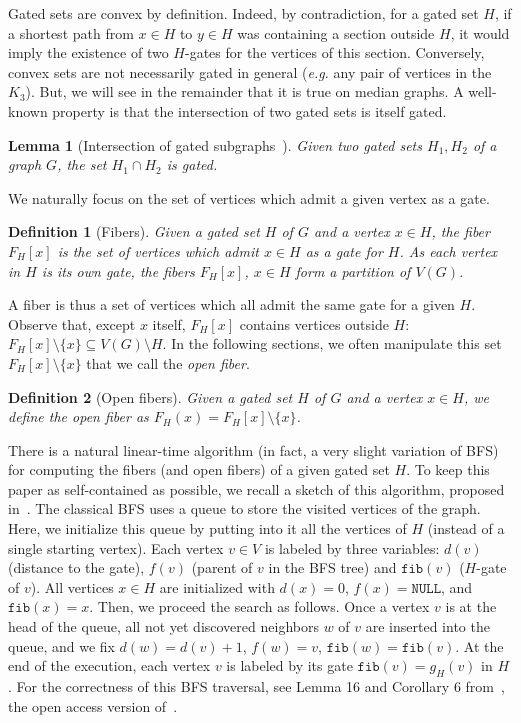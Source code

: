 \documentclass[11pt,letterpaper]{article}
\newtheorem{lemma}{Lemma}
\newtheorem{definition}{Definition}
\begin{document}
Gated sets are convex by definition. Indeed, by contradiction, for a gated set $H$, if a shortest path from $x\in H$ to $y\in H$ was containing a section outside $H$, it would imply the existence of two $H$-gates for the vertices of this section. Conversely, convex sets are not necessarily gated in general ({\em e.g.} any pair of vertices in the $K_3$). But, we will see in the remainder that it is true on median graphs. A well-known property is that the intersection of two gated sets is itself gated.

\begin{lemma}[Intersection of gated subgraphs~\cite{BaCh08}]
Given two gated sets $H_1,H_2$ of a graph $G$, the set $H_1\cap H_2$ is gated. 
\label{le:intersection}
\end{lemma}

We naturally focus on the set of vertices which admit a given vertex as a gate.

\begin{definition}[Fibers]
Given a gated set $H$ of $G$ and a vertex $x \in H$, the \textit{fiber} $F_H[x]$ is the set of vertices which admit $x \in H$ as a gate for $H$. As each vertex in $H$ is its own gate, the fibers $F_H[x]$, $x \in H$ form a partition of $V(G)$.
\end{definition}

A fiber is thus a set of vertices which all admit the same gate for a given $H$. Observe that, except $x$ itself, $F_H[x]$ contains vertices outside $H$: $F_H[x] \setminus \{x\} \subseteq V(G) \setminus H$. In the following sections, we often manipulate this set $F_H[x] \setminus \{x\}$ that we call the \emph{open fiber}.

\begin{definition}[Open fibers]
Given a gated set $H$ of $G$ and a vertex $x \in H$, we define the \emph{open fiber} as $F_H(x) = F_H[x] \setminus \{x\}$.
\label{def:open_fiber}
\end{definition}

There is a natural linear-time algorithm (in fact, a very slight variation of BFS) for computing the fibers (and open fibers) of a given gated set $H$. To keep this paper as self-contained as possible, we recall a sketch of this algorithm, proposed in~\cite{ChLaRa19}. The classical BFS uses a queue to store the visited vertices of the graph. Here, we initialize this queue by putting into it all the vertices of $H$ (instead of a single starting vertex). Each vertex $v \in V$ is labeled by three variables: $d(v)$ (distance to the gate), $f(v)$ (parent of $v$ in the BFS tree) and $\texttt{fib}(v)$ ($H$-gate of $v$). All vertices $x \in H$ are initialized with $d(x) = 0$, $f(x) = \texttt{NULL}$, and $\texttt{fib}(x) = x$. 
Then, we proceed the search as follows. Once a vertex $v$ is at the head of the queue, all not yet discovered neighbors $w$ of $v$ are inserted into the queue, and we fix $d(w) = d(v) + 1$, $f(w) = v$, $\texttt{fib}(w) = \texttt{fib}(v)$. At the end of the execution, each vertex $v$ is labeled by its gate $\texttt{fib}(v) = g_H(v)$ in $H$. For the correctness of this BFS traversal, see Lemma 16 and Corollary 6 from~\cite{ChLaRa18}, the open access version of~\cite{ChLaRa19}.
\end{document}
